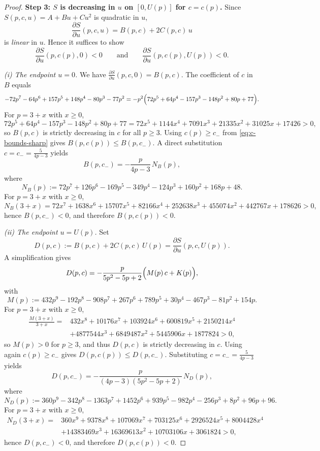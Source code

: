 \documentclass[10pt,a4paper]{amsart}
\begin{document}
\begin{proof}
\medskip
\noindent\textbf{Step 3: $S$ is decreasing in $u$ on $[0,U(p)]$ for $c=c(p)$.}
Since $S(p,c,u)=A+B u+C u^2$ is quadratic in $u$,
\[
\frac{\partial S}{\partial u}(p,c,u)=B(p,c)+2C(p,c)\,u
\]
is \emph{linear} in $u$. Hence it suffices to show
\begin{equation}\label{eq:Su-endpoints}
\frac{\partial S}{\partial u}(p,c(p),0)<0
\qquad\text{and}\qquad
\frac{\partial S}{\partial u}(p,c(p),U(p))<0.
\end{equation}

\smallskip
\emph{(i) The endpoint $u=0$.}
We have $\frac{\partial S}{\partial u}(p,c,0)=B(p,c)$. The coefficient of $c$ in $B$
equals
\[
-72p^7-64p^6+157p^5+148p^4-80p^3-77p^2
=
-p^2\Bigl(72p^5+64p^4-157p^3-148p^2+80p+77\Bigr).
\]
For $p=3+x$ with $x\ge0$,
\[
72p^5+64p^4-157p^3-148p^2+80p+77
=
72x^5+1144x^4+7091x^3+21335x^2+31025x+17426>0,
\]
so $B(p,c)$ is strictly decreasing in $c$ for all $p\ge3$.
Using $c(p)\ge c_-$ from \eqref{eq:c-bounds-sharp} gives $B(p,c(p))\le B(p,c_-)$.
A direct substitution $c=c_-=\frac{5}{4p-3}$ yields
\[
B(p,c_-)=
-\frac{p}{4p-3}\,N_B(p),
\]
where
\[
N_B(p):=72p^7+126p^6-169p^5-349p^4-124p^3+160p^2+168p+48.
\]
For $p=3+x$ with $x\ge0$,
\[
N_B(3+x)=72x^7+1638x^6+15707x^5+82166x^4+252638x^3+455074x^2+442767x+178626>0,
\]
hence $B(p,c_-)\!<0$, and therefore $B(p,c(p))<0$.

\smallskip
\emph{(ii) The endpoint $u=U(p)$.}
Set
\[
D(p,c):=B(p,c)+2C(p,c)\,U(p)=\frac{\partial S}{\partial u}(p,c,U(p)).
\]
A simplification gives
\[
D(p,c)=
-\frac{p}{5p^2-5p+2}\Bigl(M(p)\,c + K(p)\Bigr),
\]
with
\[
M(p):=432p^9-192p^8-908p^7+267p^6+789p^5+30p^4-467p^3-81p^2+154p.
\]
For $p=3+x$ with $x\ge0$,
\begin{align*}
\frac{M(3+x)}{3+x}
=&
432x^8+10176x^7+103924x^6+600819x^5+2150214x^4\\
&+4877544x^3
+6849487x^2+5445906x+1877824>0,
\end{align*}
so $M(p)>0$ for $p\ge3$, and thus $D(p,c)$ is strictly decreasing in $c$.
Using again $c(p)\ge c_-$ gives $D(p,c(p))\le D(p,c_-)$.
Substituting $c=c_-=\frac{5}{4p-3}$ yields
\[
D(p,c_-)= -\frac{p}{(4p-3)(5p^2-5p+2)}\,N_D(p),
\]
where
\[
N_D(p):=360p^9-342p^8-1363p^7+1452p^6+939p^5-982p^4-256p^3+8p^2+96p+96.
\]
For $p=3+x$ with $x\ge0$,
\begin{align*}
N_D(3+x)=&
360x^9+9378x^8+107069x^7+703125x^6+2926524x^5+8004428x^4\\&
+14383469x^3+16369613x^2+10703106x+3061824>0,
\end{align*}
hence $D(p,c_-)\!<0$, and therefore $D(p,c(p))<0$.


\end{proof}
\end{document}
